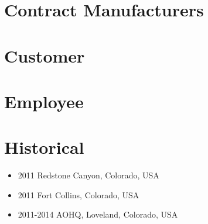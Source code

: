 \section{Contract Manufacturers}

\section{Customer}

\section{Employee}

\section{Historical}
\begin{itemize}
\item 2011 Redstone Canyon, Colorado, USA
\item 2011 Fort Collins, Colorado, USA
\item 2011-2014 AOHQ, Loveland, Colorado, USA
\end{itemize}

